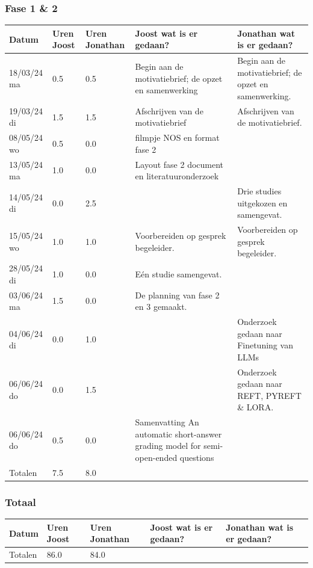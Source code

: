 \documentclass[12pt]{article}
\begin{document}
\subsubsection*{Fase 1 \& 2}
\footnotesize
\begin{longtable}{@{}p{2.5cm} p{1cm} p{1.5cm} p{5cm} p{5cm}}
\toprule
Datum  & Uren Joost & Uren Jonathan & Joost wat is er gedaan? & Jonathan wat is er gedaan?  \\
\hline
\midrule
\endhead
18/03/24 ma & 0.5 & 0.5 & Begin aan de motivatiebrief; de opzet en samenwerking & Begin aan de motivatiebrief; de opzet en samenwerking. \\
19/03/24 di & 1.5 & 1.5 & Afschrijven van de motivatiebrief & Afschrijven van de motivatiebrief. \\
08/05/24 wo & 0.5 & 0.0 & filmpje NOS en format fase 2 &  \\
13/05/24 ma & 1.0 & 0.0 & Layout fase 2 document en  literatuuronderzoek &  \\
14/05/24 di & 0.0 & 2.5 &  & Drie studies uitgekozen en samengevat. \\
15/05/24 wo & 1.0 & 1.0 & Voorbereiden op gesprek begeleider. & Voorbereiden op gesprek begeleider. \\
28/05/24 di & 1.0 & 0.0 & Eén studie samengevat. &  \\
03/06/24 ma & 1.5 & 0.0 & De planning van fase 2 en 3 gemaakt. &  \\
04/06/24 di & 0.0 & 1.0 &  & Onderzoek gedaan naar Finetuning van LLMs \\
06/06/24 do & 0.0 & 1.5 &  & Onderzoek gedaan  naar REFT, PYREFT \& LORA. \\
06/06/24 do & 0.5 & 0.0 & Samenvatting An automatic short-answer grading model for semi-open-ended questions &  \\
\midrule
Totalen & 7.5 & 8.0 & & \\
\bottomrule

\end{longtable}

\normalsize
\subsubsection*{Totaal}
\footnotesize
\begin{longtable}{@{}p{2.5cm} p{1cm} p{1.5cm} p{5cm} p{5cm}}
\toprule
Datum  & Uren Joost & Uren Jonathan & Joost wat is er gedaan? & Jonathan wat is er gedaan?  \\
\endhead
\midrule
Totalen & 86.0 & 84.0 & & \\
\bottomrule

\end{longtable}

\normalsize
\end{document}
